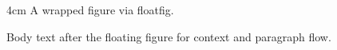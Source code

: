 \documentclass{article}
\begin{document}
\begin{floatingfigure}{4cm}
A wrapped figure via floatfig.
\end{floatingfigure}
Body text after the floating figure for context and paragraph flow.
\end{document}
